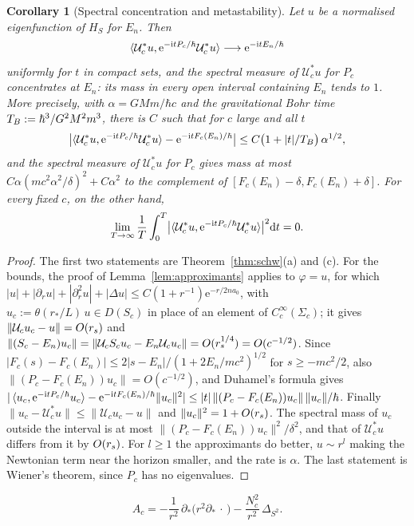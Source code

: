 \documentclass[10pt,a4paper]{amsart}
\newtheorem{corollary}{Corollary}
\theoremstyle{definition}
\theoremstyle{remark}
\newcommand{\rmd}{\mathrm{d}}
\newcommand{\rmi}{\mathrm{i}}
\newcommand{\rme}{\mathrm{e}}
\begin{document}
\begin{corollary}[Spectral concentration and metastability]
\label{cor:metastability}
Let $u$ be a normalised eigenfunction of $H_S$ for $E_n$. Then
\[
\braket{\mathcal{U}_c^*u,\rme^{-\rmi tP_c/\hbar}\mathcal{U}_c^*u}
\longrightarrow\rme^{-\rmi tE_n/\hbar}
\]
uniformly for $t$ in compact sets, and the spectral measure of $\mathcal{U}_c^*u$ for $P_c$ concentrates at $E_n$:
its mass in every open interval containing $E_n$ tends to $1$. More
precisely, with $\alpha=GMm/\hbar c$ and the gravitational Bohr time
$T_{\rm B}:=\hbar^3/G^2M^2m^3$, there is $C$ such that for $c$ large and
all $t$
\[
\bigl|\braket{\mathcal{U}_c^*u,\rme^{-\rmi tP_c/\hbar}\mathcal{U}_c^*u}
-\rme^{-\rmi tF_c(E_n)/\hbar}\bigr|\leq C\bigl(1+|t|/T_{\rm B}\bigr)\,
\alpha^{1/2},
\]
and the spectral measure of $\mathcal{U}_c^*u$ for $P_c$ gives mass at
most $C\alpha(mc^2\alpha^2/\delta)^2+C\alpha^2$ to the complement of
$[F_c(E_n)-\delta,F_c(E_n)+\delta]$.
For every fixed $c$, on the other hand,
\[
\lim_{T\to\infty}\frac1T\int_0^T\bigl|\braket{\mathcal{U}_c^*u,
\rme^{-\rmi tP_c/\hbar}\mathcal{U}_c^*u}\bigr|^2\rmd t=0 .
\]
\end{corollary}

\begin{proof}
The first two statements are Theorem~\ref{thm:schw}(a) and (c). For the
bounds, the proof of Lemma~\ref{lem:approximants} applies to
$\varphi=u$, for which $|u|+|\partial_ru|+|\partial_r^2u|+|\Delta u|\leq
C(1+r^{-1})\rme^{-r/2na_0}$, with $u_c:=\theta(r_*/L)\,u\in D(S_c)$ in
place of an element of $C_c^\infty(\Sigma_c)$; it gives
$\|\mathcal{U}_cu_c-u\|=O(r_{\rm s})$ and
$\|(S_c-E_n)u_c\|=\|\mathcal{U}_cS_cu_c-E_n\mathcal{U}_cu_c\|=
O(r_{\rm s}^{1/4})=O(c^{-1/2})$. Since
$|F_c(s)-F_c(E_n)|\leq2|s-E_n|/(1+2E_n/mc^2)^{1/2}$ for $s\geq-mc^2/2$,
also $\|(P_c-F_c(E_n))u_c\|=O(c^{-1/2})$, and Duhamel's formula gives
$|\braket{u_c,\rme^{-\rmi tP_c/\hbar}u_c}-\rme^{-\rmi tF_c(E_n)/\hbar}
\|u_c\|^2|\leq|t|\,\|(P_c-F_c(E_n))u_c\|\,\|u_c\|/\hbar$. Finally
$\|u_c-\mathcal{U}_c^*u\|\leq\|\mathcal{U}_cu_c-u\|$ and
$\|u_c\|^2=1+O(r_{\rm s})$. The spectral mass of $u_c$ outside the
interval is at most $\|(P_c-F_c(E_n))u_c\|^2/\delta^2$, and that of
$\mathcal{U}_c^*u$ differs from it by $O(r_{\rm s})$. For $l\geq1$ the
approximants do better, $u\sim r^l$ making the Newtonian term near the
horizon smaller, and the rate is $\alpha$. The last statement is Wiener's
theorem, since $P_c$ has no eigenvalues.
\end{proof}

\setcounter{equation}{32}
\setcounter{alemma}{2}
\begin{equation}\label{eq:Ac-tortoise}
A_c=-\frac{1}{r^2}\,\partial_*\bigl(r^2\partial_*\,\cdot\,\bigr)-
\frac{N_c^2}{r^2}\,\Delta_{S^2}.
\end{equation}
\end{document}

